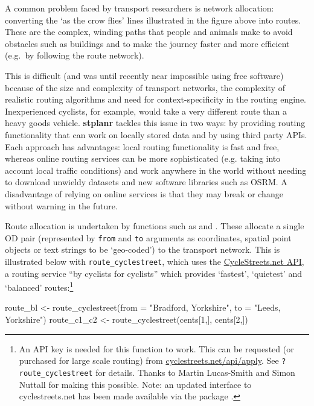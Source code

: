 A common problem faced by transport researchers is network allocation:
converting the `as the crow flies' lines illustrated in the figure above
into routes. These are the complex, winding paths that people and
animals make to avoid obstacles such as buildings and to make the
journey faster and more efficient (e.g.~by following the route network).

This is difficult (and was until recently near impossible using free
software) because of the size and complexity of transport networks, the
complexity of realistic routing algorithms and need for
context-specificity in the routing engine. Inexperienced cyclists, for
example, would take a very different route than a heavy goods vehicle.
\textbf{stplanr} tackles this issue in two ways: by providing routing
functionality that can work on locally stored data and by using third party APIs.
Each approach has advantages: local routing functionality is fast and free,
whereas online routing services can be more sophisticated (e.g. taking
into account local traffic conditions) and work anywhere in the world
without needing to download unwieldy datasets and new software libraries such
as OSRM.
A disadvantage of relying on online services is that they may break or change
without warning in the future.

Route allocation is undertaken by  functions such as
 and \linebreak {}.
These allocate a single OD pair (represented by \texttt{from} and \texttt{to}
arguments as coordinates,
spatial point objects or text strings to be
`geo-coded') to the transport network.
This is illustrated
below with \texttt{route\_cyclestreet}, which uses the
\href{http://www.cyclestreets.net/api/}{CycleStreets.net API}, a routing
service ``by cyclists for cyclists'' which provides
`fastest', `quietest' and `balanced' routes:\footnote{An
API key
  is needed for this function to work. This can be requested (or
  purchased for large scale routing) from
  \href{https://www.cyclestreets.net/api/apply/}{cyclestreets.net/api/apply}.
  See \texttt{?route\_cyclestreet} for details. Thanks to Martin
  Lucas-Smith and Simon Nuttall for making this possible.
  Note: an updated interface to cyclestreets.net has been made available via the package .}

\begin{Schunk}
\begin{Sinput}
route_bl <- route_cyclestreet(from = "Bradford, Yorkshire", to = "Leeds, Yorkshire")
route_c1_c2 <- route_cyclestreet(cents[1,], cents[2,])
\end{Sinput}
\end{Schunk}

